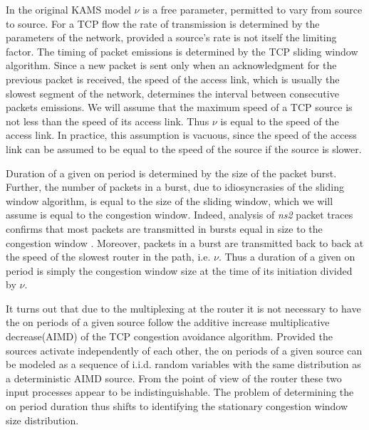 \documentclass{IEEEtran}[10pt,letterpaper,conference]
\begin{document}
In the original KAMS model $\nu$ is a free parameter, permitted to vary from source to source. For a TCP flow the rate of transmission is determined by the parameters of the network, provided a source's rate is not itself the limiting factor. The timing of packet emissions is determined by the TCP sliding window algorithm. Since a new packet is sent only when an acknowledgment for the previous packet is received, the speed of the access link, which is usually the slowest segment of the network, determines the interval between consecutive packets emissions. We will assume that the maximum speed of a TCP source is not less than the speed of its access link. Thus $\nu$ is equal to the speed of the access link. In practice, this assumption is vacuous, since the speed of the access link can be assumed to be equal to the speed of the source if the source is slower.

Duration of a given on period is determined by the size of the packet burst. Further, the number of packets in a burst, due to idiosyncrasies of the sliding window algorithm, is equal to the size of the sliding window, which we will assume is equal to the congestion window. Indeed, analysis of \emph{ns2} packet traces confirms that most packets are transmitted in bursts equal in size to the congestion window \cite{GenMar}. Moreover, packets in a burst are transmitted back to back at the speed of the slowest router in the path, i.e. $\nu$. Thus a duration of a given on period is simply the congestion window size at the time of its initiation divided by $\nu$.

It turns out that due to the multiplexing at the router it is not necessary to have the on periods of a given source follow the additive increase multiplicative decrease(AIMD) of the TCP congestion avoidance algorithm. Provided the sources activate independently of each other, the on periods of a given source can be modeled as a sequence of i.i.d. random variables with the same distribution as a deterministic AIMD source. From the point of view of the router these two input processes appear to be indistinguishable. The problem of determining the on period duration thus shifts to identifying the stationary congestion window size distribution.
\end{document}
